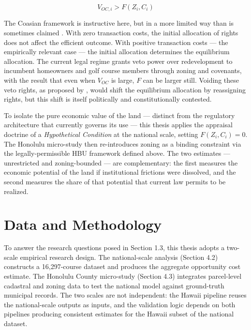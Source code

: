 \documentclass[11pt, letterpaper]{article}
\begin{document}
\begin{equation}
    V_{OC, i} > F(Z_i, C_i)
\end{equation}

The Coasian framework is instructive here, but in a more limited way than is sometimes claimed \parencite{Coase1960}. With zero transaction costs, the initial allocation of rights does not affect the efficient outcome. With positive transaction costs --- the empirically relevant case --- the initial allocation determines the equilibrium allocation. The current legal regime grants veto power over redevelopment to incumbent homeowners and golf course members through zoning and covenants, with the result that even when $V_{OC}$ is large, $F$ can be larger still. Voiding these veto rights, as proposed by \textcite{Korngold2024}, would shift the equilibrium allocation by reassigning rights, but this shift is itself politically and constitutionally contested.

To isolate the pure economic value of the land --- distinct from the regulatory architecture that currently governs its use --- this thesis applies the appraisal doctrine of a \textit{Hypothetical Condition} \parencite{AppraisalInstitute2020} at the national scale, setting $F(Z_i, C_i) = 0$. The Honolulu micro-study then re-introduces zoning as a binding constraint via the legally-permissible HBU framework defined above. The two estimates --- unrestricted and zoning-bounded --- are complementary: the first measures the economic potential of the land if institutional frictions were dissolved, and the second measures the share of that potential that current law permits to be realized.

\newpage

\section{Data and Methodology}

To answer the research questions posed in Section 1.3, this thesis adopts a two-scale empirical research design. The national-scale analysis (Section 4.2) constructs a 16,297-course dataset and produces the aggregate opportunity cost estimate. The Honolulu County micro-study (Section 4.3) integrates parcel-level cadastral and zoning data to test the national model against ground-truth municipal records. The two scales are not independent: the Hawaii pipeline reuses the national-scale outputs as inputs, and the validation logic depends on both pipelines producing consistent estimates for the Hawaii subset of the national dataset.
\end{document}
